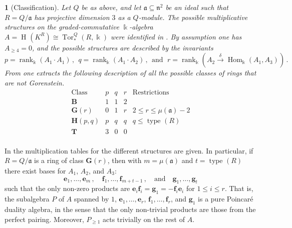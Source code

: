 \documentclass{amsart}
\theoremstyle{bfupright head,upright body}
\newtheorem{bfhpg}[res]{}               \newtheorem*{bfhpg*}{}
\theoremstyle{fixed bf head,slanted body}
\theoremstyle{fixed bf head,upright body}
\theoremstyle{numbered paragraph}
\newcommand{\thmcite}[2][?]{\cite[thm.~#1]{#2}}
\newcommand{\kk}{\Bbbk}
\newcommand{\n}{\mathfrak{n}}
\newcommand{\is}{\cong}
\newcommand{\xra}[2][]{\xrightarrow[#1]{\;#2\;}}
\renewcommand{\H}[2][]{\operatorname{H}_{#1}(#2)}
\newcommand{\rnk}[2][k]{\operatorname{rank}_{#1}#2}
\newcommand{\type}[2][R]{\operatorname{type}_{#1}#2}
\newcommand{\Hom}[3][R]{\operatorname{Hom}_{#1}(#2,#3)}
\newcommand{\Tor}[4][R]{\operatorname{Tor}^{#1}_{#2}(#3,#4)}
\newcommand{\clT}{\mathbf{T}}
\newcommand{\clB}{\mathbf{B}}
\newcommand{\clG}[1]{\mathbf{G}(#1)}
\newcommand{\clH}[1]{\mathbf{H}(#1)}
\newcommand{\fa}{\mathfrak{a}}
\numberwithin{equation}{res}
\begin{document}
\begin{bfhpg}[Classification]
  \label{class}
  Let $Q$ be as above, and let $\fa \subseteq \n^2$ be an ideal such
  that $R = Q/\fa$ has projective dimension $3$ as a $Q$-module. The
  possible multiplicative structures on the graded-commutative
  $\kk$-algebra $A = \H{K^R} \is \Tor[Q]{*}{R}{\kk}$ were identified
  in \cite{AKM-88}.  By assumption one has $A_{\ge 4} =0$, and the
  possible structures are described by the invariants
  \begin{equation*}
    p = \rnk[\kk]{(A_1\cdot A_1)}\,, \ \ 
    q = \rnk[\kk]{(A_1\cdot A_2)}\,, \ \ \text{and}\, \ \   
    r = \rnk[\kk]{(A_2 \xra{\delta} \Hom[\kk]{A_1}{A_3})}\,.
  \end{equation*}
  From \thmcite[3.1]{LLA12} one extracts the following description of
  all the possible classes of rings that are not Gorenstein.
  \begin{equation}
    \label{eq:tab}
    \begin{array}{r|ccc|l}
      \text{Class} &  p & q & r & \text{Restrictions}\\
      \hline
      \clB & 1 &1 &2 \\
      \clG{r} & 0 &1 &r & 2 \le r \le \mu(\fa)-2\\
      \clH{p,q} &  p & q & q & q \le \type[]{(R)}\\
      \clT & 3 &0 &0 \\
    \end{array}
  \end{equation}  
\end{bfhpg}
\noindent
In \cite{AKM-88} the multiplication tables for the different
structures are given. In particular, if $R = Q/\fa$ is a ring of class
$\clG{r}$, then with $m = \mu(\fa)$ and $t = \type[]{(R)}$ there exist
bases for $A_1$, $A_2$, and $A_3$:
\begin{equation*}
  \mathbf{e}_1,\ldots,\mathbf{e}_m\,,\quad \mathbf{f}_1,\ldots,\mathbf{f}_{m+t-1}\,,
  \quad \text{and}\quad \mathbf{g}_1,
  \ldots,\mathbf{g}_t
\end{equation*}
such that the only non-zero products are $\mathbf{e}_i\mathbf{f}_i =
\mathbf{g}_1 = -\mathbf{f}_i\mathbf{e}_i$ for $1\le i \le r$. That is,
the subalgebra $P$ of $A$ spanned by $1$,
$\mathbf{e}_1,\ldots,\mathbf{e}_r$,
$\mathbf{f}_1,\ldots,\mathbf{f}_r$, and $\mathbf{g}_1$ is a pure
Poincar\'e duality algebra, in the sense that the only non-trivial
products are those from the perfect pairing. Moreover, $P_{\ge 1}$
acts trivially on the rest of $A$.
\end{document}
